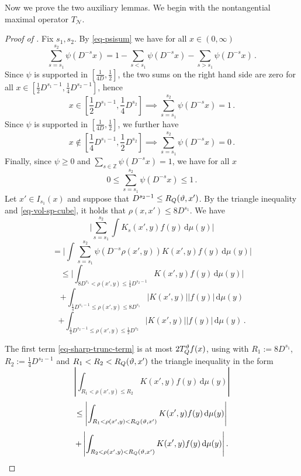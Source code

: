 Now we prove the two auxiliary lemmas. We begin with the nontangential maximal operator $T_{\mathcal{N}}$.

\begin{proof}[Proof of ]
    \leanok
    Fix $s_1, s_2$. By \eqref{eq-psisum} we have for all $x \in (0, \infty)$
    $$
        \sum_{s = s_1}^{s_2} \psi(D^{-s}x) = 1 - \sum_{s < s_1} \psi(D^{-s}x) - \sum_{s > s_1} \psi(D^{-s}x)\,.
    $$
    Since $\psi$ is supported in $[\frac{1}{4D}, \frac{1}{2}]$, the two sums on the right hand side are zero for all $x \in [\frac{1}{2}D^{s_1-1}, \frac{1}{4} D^{s_2 - 1}]$, hence
    $$
        x \in [\frac{1}{2}D^{s_1-1}, \frac{1}{4} D^{s_2}] \implies \sum_{s = s_1}^{s_2} \psi(D^{-s}x) = 1\,.
    $$
    Since $\psi$ is supported in $[\frac{1}{4D}, \frac{1}{2}]$, we further have
    $$
        x \notin [\frac{1}{4}D^{s_1 - 1}, \frac{1}{2}D^{s_2}] \implies \sum_{s = s_1}^{s_2} \psi(D^{-s}x) = 0\,.
    $$
    Finally, since $\psi \ge 0$ and $\sum_{s \in \mathbb{Z}} \psi(D^{-s}x) = 1$, we have for all $x$
    $$
        0 \le \sum_{s = s_1}^{s_2} \psi(D^{-s}x) \le 1\,.
    $$
    Let $x' \in I_{s_1}(x)$ and suppose that $D^{s_2 - 1} \le R_Q({\vartheta}, x')$. By the triangle inequality and \eqref{eq-vol-sp-cube}, it holds that $\rho(x,x') \le 8D^{s_1}$. We have
    $$
        \Bigg|\sum_{s = s_1}^{s_2} \int K_s(x',y) f(y) \, \mathrm{d}\mu(y)\Bigg|
    $$
    $$
        = \Bigg|\int \sum_{s = s_1}^{s_2} \psi(D^{-s}\rho(x',y)) K(x',y) f(y) \, \mathrm{d}\mu(y)\Bigg|
    $$
    \begin{equation}
        \label{eq-sharp-trunc-term}
        \le \Bigg| \int_{8D^{s_1} < \rho(x',y) \le \frac{1}{4}D^{s_2-1}} K(x',y) f(y) \, \mathrm{d}\mu(y) \Bigg|
    \end{equation}
    \begin{equation}
        \label{eq-lower-bound-term}
        + \int_{\frac{1}{4}D^{s_1-1} \le \rho(x',y) \le 8D^{s_1}} |K(x', y)| |f(y)| \, \mathrm{d}\mu(y)
    \end{equation}
    \begin{equation}
        \label{eq-upper-bound-term}
        + \int_{\frac{1}{4}D^{s_2-1} \le \rho(x',y) \le \frac{1}{2}D^{s_2}} |K(x', y)| |f(y)| \, \mathrm{d}\mu(y)\,.
    \end{equation}

    The first term \eqref{eq-sharp-trunc-term} is at most $2T_{{Q}}^{\vartheta} f(x)$, using with $R_1 := 8D^{s_1}$, $R_2 := \frac{1}{4}D^{s_2-1}$ and $R_1 < R_2 < R_{{Q}}({\vartheta},x')$ the triangle inequality in the form
    \begin{equation}
        \left|\int_{R_1 < \rho(x',y) \le R_2} K(x',y) f(y) \, \mathrm{d}\mu(y) \right|
    \end{equation}
    \begin{equation}
        \le \left|\int_{R_1 < \rho(x',y) < R_{{Q}}({\vartheta},x')} K(x',y) f(y) \, \mathrm{d}\mu(y) \right|
    \end{equation}
    \begin{equation}
        + \left|\int_{R_2 < \rho(x',y) < R_{{Q}}({\vartheta},x')} K(x',y) f(y) \, \mathrm{d}\mu(y) \right|.
    \end{equation}


\end{proof}
